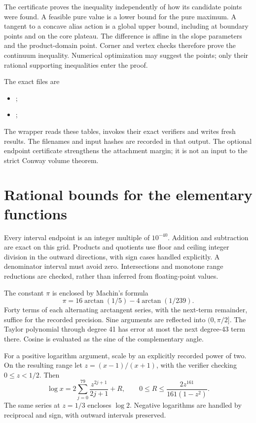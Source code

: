 The certificate proves the inequality independently of how its candidate points were found. A feasible pure value is a lower bound for the pure maximum. A tangent to a concave alias action is a global upper bound, including at boundary points and on the core plateau. The difference is affine in the slope parameters and the product-domain point. Corner and vertex checks therefore prove the continuum inequality. Numerical optimization may suggest the points; only their rational supporting inequalities enter the proof.

The exact files are
\begin{itemize}
\item {};
\item {};

\end{itemize}
The wrapper  reads
these tables, invokes their exact verifiers and writes fresh results.
The filenames and input hashes are recorded in that output. The optional endpoint certificate strengthens the attachment margin; it is not an input to the strict Conway volume theorem.

\section{Rational bounds for the elementary functions}
Every interval endpoint is an integer multiple of $10^{-40}$. Addition and subtraction are exact on this grid. Products and quotients use floor and ceiling integer division in the outward directions, with sign cases handled explicitly. A denominator interval must avoid zero. Intersections and monotone range reductions are checked, rather than inferred from floating-point values.

The constant $\pi$ is enclosed by Machin's formula
\[
 \pi=16\arctan(1/5)-4\arctan(1/239).
\]
Forty terms of each alternating arctangent series, with the next-term remainder, suffice for the recorded precision. Sine arguments are reflected into $(0,\pi/2]$. The Taylor polynomial through degree 41 has error at most the next degree-43 term there. Cosine is evaluated as the sine of the complementary angle.

For a positive logarithm argument, scale by an explicitly recorded power of two. On the resulting range let $z=(x-1)/(x+1)$, with the verifier checking $0\le z<1/2$. Then
\[
 \log x=2\sum_{j=0}^{79}\frac{z^{2j+1}}{2j+1}+R,
 \qquad 0\le R\le\frac{2z^{161}}{161(1-z^2)}.
\]
The same series at $z=1/3$ encloses $\log2$. Negative logarithms are handled by reciprocal and sign, with outward intervals preserved.

